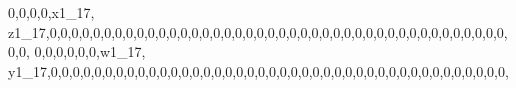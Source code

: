 \documentclass[]{article}
\newenvironment{Shaded}{\begin{snugshade}}{\end{snugshade}}
\newcommand{\DecValTok}[1]{\textcolor[rgb]{0.00,0.00,0.81}{#1}}
\newcommand{\NormalTok}[1]{#1}
\begin{document}
\begin{Shaded}
\begin{Highlighting}[]
\DecValTok{0}\NormalTok{,}\DecValTok{0}\NormalTok{,}\DecValTok{0}\NormalTok{,}\DecValTok{0}\NormalTok{,x1_}\DecValTok{17}\NormalTok{, z1_}\DecValTok{17}\NormalTok{,}\DecValTok{0}\NormalTok{,}\DecValTok{0}\NormalTok{,}\DecValTok{0}\NormalTok{,}\DecValTok{0}\NormalTok{,}\DecValTok{0}\NormalTok{,}\DecValTok{0}\NormalTok{,}\DecValTok{0}\NormalTok{,}\DecValTok{0}\NormalTok{,}\DecValTok{0}\NormalTok{,}\DecValTok{0}\NormalTok{,}\DecValTok{0}\NormalTok{,}\DecValTok{0}\NormalTok{,}\DecValTok{0}\NormalTok{,}\DecValTok{0}\NormalTok{,}\DecValTok{0}\NormalTok{,}\DecValTok{0}\NormalTok{,}\DecValTok{0}\NormalTok{,}\DecValTok{0}\NormalTok{,}\DecValTok{0}\NormalTok{,}\DecValTok{0}\NormalTok{,}\DecValTok{0}\NormalTok{,}\DecValTok{0}\NormalTok{,}\DecValTok{0}\NormalTok{,}\DecValTok{0}\NormalTok{,}\DecValTok{0}\NormalTok{,}\DecValTok{0}\NormalTok{,}\DecValTok{0}\NormalTok{,}\DecValTok{0}\NormalTok{,}\DecValTok{0}\NormalTok{,}\DecValTok{0}\NormalTok{,}\DecValTok{0}\NormalTok{,}\DecValTok{0}\NormalTok{,}\DecValTok{0}\NormalTok{,}\DecValTok{0}\NormalTok{,}\DecValTok{0}\NormalTok{,}\DecValTok{0}\NormalTok{,}\DecValTok{0}\NormalTok{,}\DecValTok{0}\NormalTok{,}\DecValTok{0}\NormalTok{,}\DecValTok{0}\NormalTok{,}\DecValTok{0}\NormalTok{,}\DecValTok{0}\NormalTok{,}\DecValTok{0}\NormalTok{,}\DecValTok{0}\NormalTok{,}
\DecValTok{0}\NormalTok{,}\DecValTok{0}\NormalTok{,}\DecValTok{0}\NormalTok{,}\DecValTok{0}\NormalTok{,}\DecValTok{0}\NormalTok{,}\DecValTok{0}\NormalTok{,w1_}\DecValTok{17}\NormalTok{, y1_}\DecValTok{17}\NormalTok{,}\DecValTok{0}\NormalTok{,}\DecValTok{0}\NormalTok{,}\DecValTok{0}\NormalTok{,}\DecValTok{0}\NormalTok{,}\DecValTok{0}\NormalTok{,}\DecValTok{0}\NormalTok{,}\DecValTok{0}\NormalTok{,}\DecValTok{0}\NormalTok{,}\DecValTok{0}\NormalTok{,}\DecValTok{0}\NormalTok{,}\DecValTok{0}\NormalTok{,}\DecValTok{0}\NormalTok{,}\DecValTok{0}\NormalTok{,}\DecValTok{0}\NormalTok{,}\DecValTok{0}\NormalTok{,}\DecValTok{0}\NormalTok{,}\DecValTok{0}\NormalTok{,}\DecValTok{0}\NormalTok{,}\DecValTok{0}\NormalTok{,}\DecValTok{0}\NormalTok{,}\DecValTok{0}\NormalTok{,}\DecValTok{0}\NormalTok{,}\DecValTok{0}\NormalTok{,}\DecValTok{0}\NormalTok{,}\DecValTok{0}\NormalTok{,}\DecValTok{0}\NormalTok{,}\DecValTok{0}\NormalTok{,}\DecValTok{0}\NormalTok{,}\DecValTok{0}\NormalTok{,}\DecValTok{0}\NormalTok{,}\DecValTok{0}\NormalTok{,}\DecValTok{0}\NormalTok{,}\DecValTok{0}\NormalTok{,}\DecValTok{0}\NormalTok{,}\DecValTok{0}\NormalTok{,}\DecValTok{0}\NormalTok{,}\DecValTok{0}\NormalTok{,}\DecValTok{0}\NormalTok{,}\DecValTok{0}\NormalTok{,}\DecValTok{0}\NormalTok{,}\DecValTok{0}\NormalTok{,}\DecValTok{0}\NormalTok{,}

\end{Highlighting}
\end{Shaded}
\end{document}
